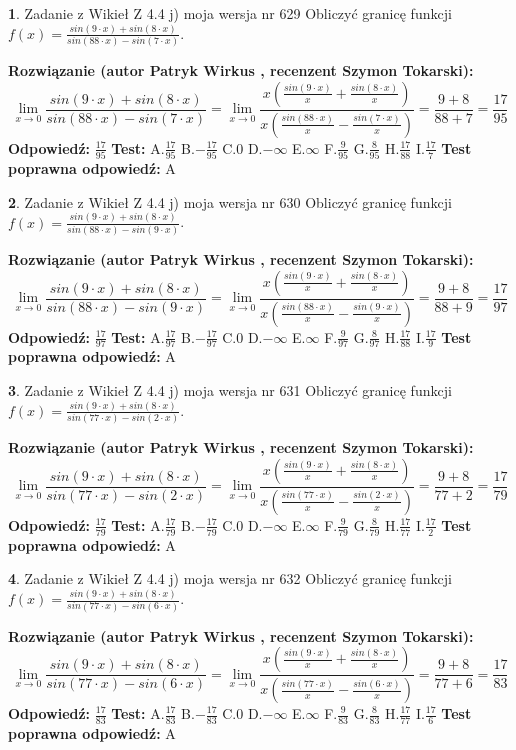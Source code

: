 \documentclass[12pt, a4paper]{article}
\theoremstyle{definition} %
\newtheorem{zad}{}
\newcommand{\zadStart}[1]{\begin{zad}#1\newline}
\newcommand{\zadStop}{\end{zad}}
\newcommand{\rozwStart}[2]{\noindent \textbf{Rozwiązanie (autor #1 , recenzent #2): }\newline}
\newcommand{\rozwStop}{\newline}
\newcommand{\odpStart}{\noindent \textbf{Odpowiedź:}\newline}
\newcommand{\odpStop}{\newline}
\newcommand{\testStart}{\noindent \textbf{Test:}\newline}
\newcommand{\testStop}{\newline}
\newcommand{\kluczStart}{\noindent \textbf{Test poprawna odpowiedź:}\newline}
\newcommand{\kluczStop}{\newline}
\begin{document}
\zadStart{Zadanie z Wikieł Z 4.4 j) moja wersja nr 629}
Obliczyć granicę funkcji $f(x)=\frac{sin(9\cdot x) +sin(8\cdot x)}{sin(88\cdot x) -sin(7\cdot x)}$.
\zadStop
\rozwStart{Patryk Wirkus}{Szymon Tokarski}
$$\lim\limits_{x\to 0}\frac{sin(9\cdot x) +sin(8\cdot x)}{sin(88\cdot x) -sin(7\cdot x)}=\lim\limits_{x\to 0}\frac{x(\frac{sin(9\cdot x)}{x}+\frac{sin(8\cdot x)}{x})}{x(\frac{sin(88\cdot x)}{x}-\frac{sin(7\cdot x)}{x})}=\frac{9+8}{88+7} = \frac{17}{95}$$
\rozwStop
\odpStart
$\frac{17}{95}$
\odpStop
\testStart
A.$\frac{17}{95}$
B.$-\frac{17}{95}$
C.$0$
D.$-\infty$
E.$\infty$
F.$\frac{9}{95}$
G.$\frac{8}{95}$
H.$\frac{17}{88}$
I.$\frac{17}{7}$
\testStop
\kluczStart
A
\kluczStop



\zadStart{Zadanie z Wikieł Z 4.4 j) moja wersja nr 630}
Obliczyć granicę funkcji $f(x)=\frac{sin(9\cdot x) +sin(8\cdot x)}{sin(88\cdot x) -sin(9\cdot x)}$.
\zadStop
\rozwStart{Patryk Wirkus}{Szymon Tokarski}
$$\lim\limits_{x\to 0}\frac{sin(9\cdot x) +sin(8\cdot x)}{sin(88\cdot x) -sin(9\cdot x)}=\lim\limits_{x\to 0}\frac{x(\frac{sin(9\cdot x)}{x}+\frac{sin(8\cdot x)}{x})}{x(\frac{sin(88\cdot x)}{x}-\frac{sin(9\cdot x)}{x})}=\frac{9+8}{88+9} = \frac{17}{97}$$
\rozwStop
\odpStart
$\frac{17}{97}$
\odpStop
\testStart
A.$\frac{17}{97}$
B.$-\frac{17}{97}$
C.$0$
D.$-\infty$
E.$\infty$
F.$\frac{9}{97}$
G.$\frac{8}{97}$
H.$\frac{17}{88}$
I.$\frac{17}{9}$
\testStop
\kluczStart
A
\kluczStop



\zadStart{Zadanie z Wikieł Z 4.4 j) moja wersja nr 631}
Obliczyć granicę funkcji $f(x)=\frac{sin(9\cdot x) +sin(8\cdot x)}{sin(77\cdot x) -sin(2\cdot x)}$.
\zadStop
\rozwStart{Patryk Wirkus}{Szymon Tokarski}
$$\lim\limits_{x\to 0}\frac{sin(9\cdot x) +sin(8\cdot x)}{sin(77\cdot x) -sin(2\cdot x)}=\lim\limits_{x\to 0}\frac{x(\frac{sin(9\cdot x)}{x}+\frac{sin(8\cdot x)}{x})}{x(\frac{sin(77\cdot x)}{x}-\frac{sin(2\cdot x)}{x})}=\frac{9+8}{77+2} = \frac{17}{79}$$
\rozwStop
\odpStart
$\frac{17}{79}$
\odpStop
\testStart
A.$\frac{17}{79}$
B.$-\frac{17}{79}$
C.$0$
D.$-\infty$
E.$\infty$
F.$\frac{9}{79}$
G.$\frac{8}{79}$
H.$\frac{17}{77}$
I.$\frac{17}{2}$
\testStop
\kluczStart
A
\kluczStop



\zadStart{Zadanie z Wikieł Z 4.4 j) moja wersja nr 632}
Obliczyć granicę funkcji $f(x)=\frac{sin(9\cdot x) +sin(8\cdot x)}{sin(77\cdot x) -sin(6\cdot x)}$.
\zadStop
\rozwStart{Patryk Wirkus}{Szymon Tokarski}
$$\lim\limits_{x\to 0}\frac{sin(9\cdot x) +sin(8\cdot x)}{sin(77\cdot x) -sin(6\cdot x)}=\lim\limits_{x\to 0}\frac{x(\frac{sin(9\cdot x)}{x}+\frac{sin(8\cdot x)}{x})}{x(\frac{sin(77\cdot x)}{x}-\frac{sin(6\cdot x)}{x})}=\frac{9+8}{77+6} = \frac{17}{83}$$
\rozwStop
\odpStart
$\frac{17}{83}$
\odpStop
\testStart
A.$\frac{17}{83}$
B.$-\frac{17}{83}$
C.$0$
D.$-\infty$
E.$\infty$
F.$\frac{9}{83}$
G.$\frac{8}{83}$
H.$\frac{17}{77}$
I.$\frac{17}{6}$
\testStop
\kluczStart
A
\kluczStop
\end{document}
